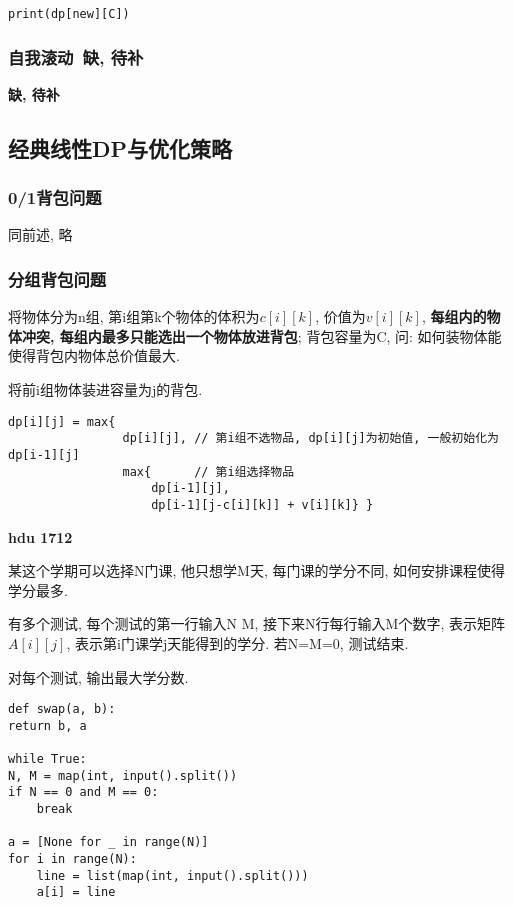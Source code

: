 \documentclass[../main]{subfiles}
\begin{document}
\begin{sloppy}
\begin{lstlisting}[style = Python]
print(dp[new][C])
\end{lstlisting}

\subsubsection{自我滚动\ 缺, 待补}

\textbf{缺, 待补}


\subsection{经典线性DP与优化策略}

\subsubsection{0/1背包问题}

同前述, 略

\newpage
\subsubsection{分组背包问题}

将物体分为n组, 第i组第k个物体的体积为$c[i][k]$, 价值为$v[i][k]$, \textbf{每组内的物体冲突, 每组内最多只能选出一个物体放进背包}; 背包容量为C, 问: 如何装物体能使得背包内物体总价值最大.

将前i组物体装进容量为j的背包.
\begin{verbatim}
dp[i][j] = max{
                dp[i][j], // 第i组不选物品, dp[i][j]为初始值, 一般初始化为dp[i-1][j]
                max{      // 第i组选择物品
                    dp[i-1][j],
                    dp[i-1][j-c[i][k]] + v[i][k]} }
\end{verbatim}

\textbf{hdu 1712}

某这个学期可以选择N门课, 他只想学M天, 每门课的学分不同, 如何安排课程使得学分最多. 

有多个测试, 每个测试的第一行输入N M, 接下来N行每行输入M个数字, 表示矩阵$A[i][j]$, 表示第i门课学j天能得到的学分. 若N=M=0, 测试结束. 

对每个测试, 输出最大学分数.

\begin{lstlisting}[style = Python]
def swap(a, b):
return b, a

while True:
N, M = map(int, input().split())
if N == 0 and M == 0:
    break

a = [None for _ in range(N)]
for i in range(N):
    line = list(map(int, input().split()))
    a[i] = line


\end{lstlisting}
\end{sloppy}
\end{document}
